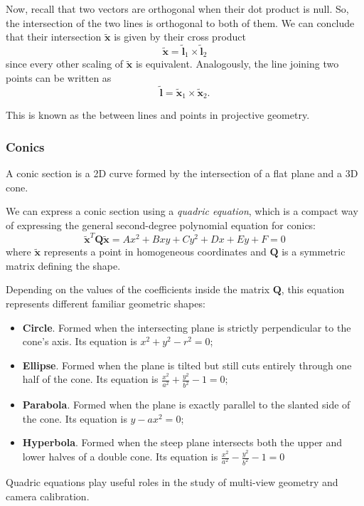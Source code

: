 Now, recall that two vectors are orthogonal when their dot product is null. So, the intersection of the two lines is orthogonal to both of them.
We can conclude that their intersection $\tilde{\mathbf{x}}$ is given by their cross product
$$\tilde{\mathbf{x}}=\tilde{\mathbf{l}}_{1}\times \tilde{\mathbf{l}}_{2}$$
since every other scaling of $\tilde{\mathbf{x}}$ is equivalent.
Analogously, the line joining two points can be written as
$$\tilde{\mathbf{l}}=\tilde{\mathbf{x}}_{1}\times \tilde{\mathbf{x}}_{2}.$$

This is known as the  between lines and points in projective geometry.

\subsubsection{Conics}
A conic section is a 2D curve formed by the intersection of a flat plane and a 3D cone.

We can express a conic section using a \emph{quadric equation}, which is a compact way of expressing the general second-degree polynomial equation for conics:
$$\tilde{\mathbf{x}}^T \mathbf{Q} \tilde{\mathbf{x}} = Ax^2 + Bxy + Cy^2 + Dx + Ey + F = 0$$
where $\tilde{\mathbf{x}}$ represents a point in homogeneous coordinates and $\mathbf{Q}$ is a symmetric matrix defining the shape.

Depending on the values of the coefficients inside the matrix $\mathbf{Q}$, this equation represents different familiar geometric shapes:
\begin{itemize}
\item \textbf{Circle}. Formed when the intersecting plane is strictly perpendicular to the cone's axis. Its equation is $x^2 + y^2 - r^2 = 0$;
\item \textbf{Ellipse}. Formed when the plane is tilted but still cuts entirely through one half of the cone. Its equation is $\frac{x^2}{a^2} + \frac{y^2}{b^2} - 1 = 0$;
\item \textbf{Parabola}. Formed when the plane is exactly parallel to the slanted side of the cone. Its equation is $y - ax^2 = 0$;
\item \textbf{Hyperbola}. Formed when the steep plane intersects both the upper and lower halves of a double cone. Its equation is $\frac{x^2}{a^2} - \frac{y^2}{b^2} - 1 = 0$
\end{itemize}

Quadric equations play useful roles in the study of multi-view geometry and camera calibration.

